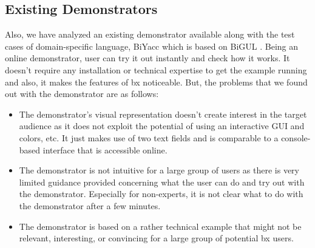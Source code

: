 \subsection{Existing Demonstrators}\label{subsec:existingdemo}
Also, we have analyzed an existing demonstrator available along with the test cases of domain-specific language, BiYacc \cite{biyacc} which is based on BiGUL \cite{bigul}. 
\newline\newline Being an online demonstrator, user can try it out instantly and check how it works. It doesn't require any installation or technical expertise to get the example running and also, it makes the features of bx noticeable.
\newline\newline But, the problems that we found out with the demonstrator are as follows: 
\begin{itemize}
	\item {The demonstrator's visual representation doesn't create interest in the target audience as it does not exploit the potential of using an interactive GUI and colors, etc. It just makes use of two text fields and is comparable to a console-based interface that is accessible online.}
	\item {The demonstrator is not intuitive for a large group of users as there is very limited guidance provided concerning what the user can do and try out with the demonstrator. Especially for non-experts, it is not clear what to do with the demonstrator after a few minutes.}
	\item {The demonstrator is based on a rather technical example that might not be relevant, interesting, or convincing for a large group of potential bx users.}		
\end{itemize}
